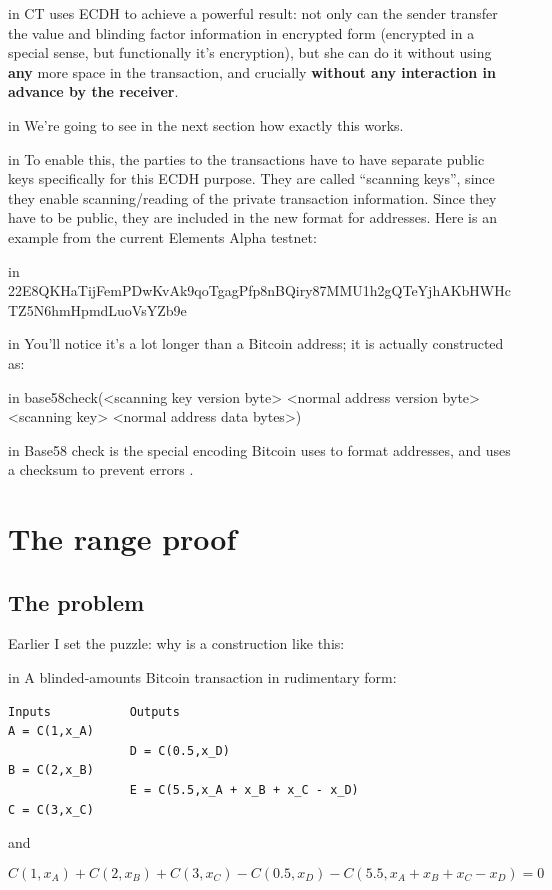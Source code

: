 \documentclass[10pt,a4paper]{article}
\begin{document}
 in \noindent CT uses ECDH to achieve a powerful result: not only can the sender transfer the value and blinding factor information in encrypted form (encrypted in a special sense, but functionally it's encryption), but she can do it without using \textbf{any} more space in the transaction, and crucially \textbf{without any interaction in advance by the receiver}.

 in \noindent We're going to see in the next section how exactly this works.

 in \noindent To enable this, the parties to the transactions have to have separate public keys specifically for this ECDH purpose. They are called ``scanning keys'', since they enable scanning/reading of the private transaction information. Since they have to be public, they are included in the new format for addresses. Here is an example from the current Elements Alpha testnet:

 in \noindent 22E8QKHaTijFemPDwKvAk9qoTgagPfp8nBQiry87MMU1h2gQTeYjhAKbHWHcTZ5N6hmHpmdLuoVsYZb9e

 in \noindent You'll notice it's a lot longer than a Bitcoin address; it is actually constructed as:

 in \noindent base58check(<scanning key version byte> <normal address version byte> <scanning key> <normal address data bytes>)

 in \noindent Base58 check is the special encoding Bitcoin uses to format addresses, and uses a checksum to prevent errors \cite{b58check}.

\section{The range proof}

\subsection{The problem}

Earlier I set the puzzle: why is a construction like this:

 in \noindent A blinded-amounts Bitcoin transaction in rudimentary form:
\begin{verbatim}
Inputs           Outputs
A = C(1,x_A)
                 D = C(0.5,x_D)
B = C(2,x_B)
                 E = C(5.5,x_A + x_B + x_C - x_D)
C = C(3,x_C)
\end{verbatim}
and

\[C(1,x_A) + C(2,x_B) + C(3,x_C) - C(0.5,x_D) - C(5.5,x_A + x_B + x_C - x_D) = 0\]
\end{document}
